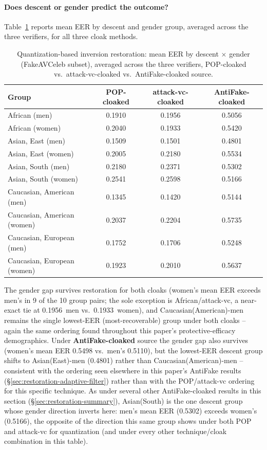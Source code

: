 \documentclass[11pt]{article}
\begin{document}
\paragraph{Does descent or gender predict the outcome?}
Table~\ref{tab:restoration-quantization-demographics} reports mean EER
by descent and gender group, averaged across the three verifiers, for
all three cloak methods.

\begin{table}[H]
\centering
\caption{Quantization-based inversion restoration: mean EER by descent
$\times$ gender (FakeAVCeleb subset), averaged across the three
verifiers, POP-cloaked vs.\ attack-vc-cloaked vs.\ AntiFake-cloaked
source.}
\label{tab:restoration-quantization-demographics}
\begin{tabular}{lccc}
\toprule
Group & POP-cloaked & attack-vc-cloaked & AntiFake-cloaked \\
\midrule
African (men)               & 0.1910 & 0.1956 & 0.5056 \\
African (women)              & 0.2040 & 0.1933 & 0.5420 \\
Asian, East (men)            & 0.1509 & 0.1501 & 0.4801 \\
Asian, East (women)          & 0.2005 & 0.2180 & 0.5534 \\
Asian, South (men)           & 0.2180 & 0.2371 & 0.5302 \\
Asian, South (women)         & 0.2541 & 0.2598 & 0.5166 \\
Caucasian, American (men)    & 0.1345 & 0.1420 & 0.5144 \\
Caucasian, American (women)  & 0.2037 & 0.2204 & 0.5735 \\
Caucasian, European (men)    & 0.1752 & 0.1706 & 0.5248 \\
Caucasian, European (women)  & 0.1923 & 0.2010 & 0.5637 \\
\bottomrule
\end{tabular}
\end{table}

The gender gap survives restoration for both cloaks (women's mean EER
exceeds men's in 9 of the 10 group pairs; the sole exception is
African/attack-vc, a near-exact tie at 0.1956~men vs.\ 0.1933~women),
and Caucasian(American)-men remains the single lowest-EER
(most-recoverable) group under both cloaks -- again the same ordering
found throughout this paper's protective-efficacy demographics. Under
\textbf{AntiFake-cloaked} source the gender gap also survives (women's
mean EER 0.5498 vs.\ men's 0.5110), but the lowest-EER descent group
shifts to Asian(East)-men (0.4801) rather than Caucasian(American)-men
-- consistent with the ordering seen elsewhere in this paper's AntiFake
results (\S\ref{sec:restoration-adaptive-filter}) rather than with the
POP/attack-vc ordering for this specific technique. As under several
other AntiFake-cloaked results in this section
(\S\ref{sec:restoration-summary}), Asian(South) is the one descent
group whose gender direction inverts here: men's mean EER (0.5302)
exceeds women's (0.5166), the opposite of the direction this same group
shows under both POP and attack-vc for quantization (and under every
other technique/cloak combination in this table).
\end{document}
